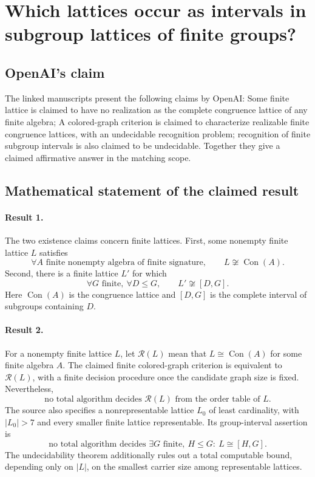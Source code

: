 \documentclass[11pt]{article}
\begin{document}
\section*{Which lattices occur as intervals in subgroup lattices of finite groups?}

\subsection{OpenAI's claim}
The linked manuscripts present the following claims by OpenAI: Some finite lattice is claimed to have no realization as the complete congruence lattice of any finite algebra; A colored-graph criterion is claimed to characterize realizable finite congruence lattices, with an undecidable recognition problem; recognition of finite subgroup intervals is also claimed to be undecidable. Together they give a claimed affirmative answer in the matching scope.

\subsection{Mathematical statement of the claimed result}
\paragraph{Result 1.} The two existence claims concern finite lattices. First, some nonempty finite lattice \(L\) satisfies
\[
 \forall A\text{ finite nonempty algebra of finite signature},\qquad
 L\not\cong\operatorname{Con}(A).
\]
Second, there is a finite lattice \(L'\) for which
\[
 \forall G\text{ finite},\ \forall D\le G,\qquad L'\not\cong[D,G].
\]
Here \(\operatorname{Con}(A)\) is the congruence lattice and \([D,G]\) is the complete interval of subgroups containing \(D\).

\paragraph{Result 2.} For a nonempty finite lattice \(L\), let \(\mathcal R(L)\) mean that \(L\cong\operatorname{Con}(A)\) for some finite algebra \(A\). The claimed finite colored-graph criterion is equivalent to \(\mathcal R(L)\), with a finite decision procedure once the candidate graph size is fixed. Nevertheless,
\[
 \text{no total algorithm decides }\mathcal R(L)\text{ from the order table of }L.
\]
The source also specifies a nonrepresentable lattice \(L_0\) of least cardinality, with \(|L_0|>7\) and every smaller finite lattice representable. Its group-interval assertion is
\[
 \text{no total algorithm decides }\exists G\text{ finite},\ H\le G:\ L\cong[H,G].
\]
The undecidability theorem additionally rules out a total computable bound, depending only on \(|L|\), on the smallest carrier size among representable lattices.
\end{document}
